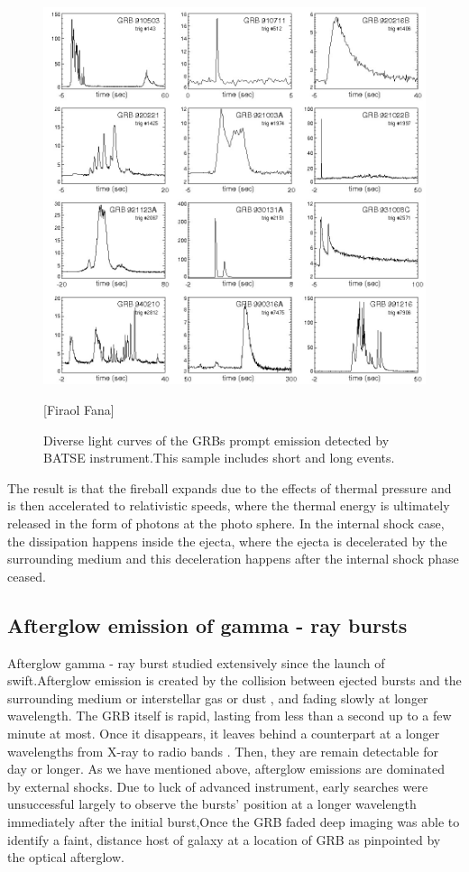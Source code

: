 \begin{figure}[h]
\begin{center}
\includegraphics[scale=0.4]{Figures/prompt.png}
\caption{Diverse light curves of the GRBs prompt emission detected by BATSE instrument.This sample includes short and long events.}[Firaol Fana]
\end{center}
\end{figure}
The result is that the fireball expands due to the effects of thermal pressure and is then accelerated to relativistic speeds, where the thermal energy is ultimately  released in the form of photons at the photo sphere. In the internal shock case,
the dissipation happens inside the ejecta, where the ejecta is decelerated by the  surrounding medium and this deceleration happens after the internal shock phase ceased. \citep{6 }\citep{23}
\subsection{Afterglow  emission  of gamma - ray  bursts}
Afterglow gamma - ray burst studied  extensively since the launch of swift.Afterglow  emission is created by the collision between ejected bursts and the surrounding medium or interstellar gas or dust , and fading slowly at longer wavelength. The GRB itself is rapid, lasting from less than a second up to a few minute at most. Once it disappears, it leaves behind a counterpart at a longer wavelengths from X-ray to radio bands . Then, they are remain detectable for day or longer. As we have mentioned above, afterglow emissions are dominated by external shocks. Due to luck of advanced instrument, early searches were unsuccessful largely to observe the bursts’ position at a longer wavelength immediately after the initial burst,Once the GRB faded deep imaging was able to identify a faint, distance host of galaxy at a location of GRB as pinpointed by the optical afterglow.\citep{15}\citep{22}\citep{23} 
